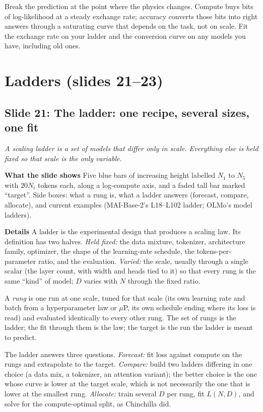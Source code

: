 \documentclass[11pt,letterpaper]{article}
\newcommand{\setstage}[1]{\colorlet{stagec}{#1}}
\newcommand{\slide}[3]{%
  \subsection[Slide #1: #2]{Slide #1: #2}%
  {\color{muted}\itshape #3\par}\medskip}
\newcommand{\para}[1]{\medskip\noindent\textbf{#1}\quad}
\newenvironment{intuition}{\begin{tcolorbox}[intuitionbox]}{\end{tcolorbox}}
\begin{document}
\begin{intuition}
Break the prediction at the point where the physics changes. Compute buys bits of log-likelihood at a steady exchange rate; accuracy converts those bits into right answers through a saturating curve that depends on the task, not on scale. Fit the exchange rate on your ladder and the conversion curve on any models you have, including old ones.
\end{intuition}

\setstage{mlp}
\section{Ladders (slides 21--23)}

\slide{21}{The ladder: one recipe, several sizes, one fit}{A scaling ladder is a set of models that differ only in scale. Everything else is held fixed so that scale is the only variable.}

\para{What the slide shows} Five blue bars of increasing height labelled $N_1$ to $N_5$ with $20N_i$ tokens each, along a log-compute axis, and a faded tall bar marked ``target''. Side boxes: what a rung is, what a ladder answers (forecast, compare, allocate), and current examples (MAI-Base-2's L18--L102 ladder; OLMo's model ladders).

\para{Details} A ladder is the experimental design that produces a scaling law. Its definition has two halves. \emph{Held fixed:} the data mixture, tokenizer, architecture family, optimizer, the shape of the learning-rate schedule, the tokens-per-parameter ratio, and the evaluation. \emph{Varied:} the scale, usually through a single scalar (the layer count, with width and heads tied to it) so that every rung is the same ``kind'' of model; $D$ varies with $N$ through the fixed ratio.

A \emph{rung} is one run at one scale, tuned for that scale (its own learning rate and batch from a hyperparameter law or $\mu$P, its own schedule ending where its loss is read) and evaluated identically to every other rung. The set of rungs is the ladder; the fit through them is the law; the target is the run the ladder is meant to predict.

The ladder answers three questions. \emph{Forecast:} fit loss against compute on the rungs and extrapolate to the target. \emph{Compare:} build two ladders differing in one choice (a data mix, a tokenizer, an attention variant); the better choice is the one whose curve is lower at the target scale, which is not necessarily the one that is lower at the smallest rung. \emph{Allocate:} train several $D$ per rung, fit $L(N,D)$, and solve for the compute-optimal split, as Chinchilla did.
\end{document}
